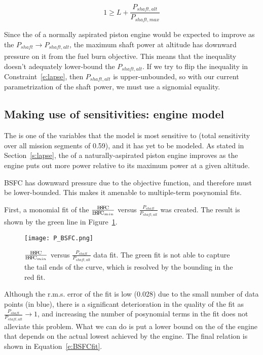 \begin{equation}
    \label{e:lapse}
    1 \geq L + \frac{P_{shaft,alt}}{P_{shaft,max}}
\end{equation}

Since the \BSFC of a normally aspirated piston engine would be expected to improve
as the $P_{shaft} \xrightarrow[]{} P_{shaft,alt}$, the maximum shaft
power at altitude has downward pressure on it from the fuel burn objective. This means that the
inequality doesn't adequately lower-bound the $P_{shaft,alt}$. If we try to flip the inequality in
Constraint~\ref{e:lapse}, then $P_{shaft,alt}$ is upper-unbounded, so with our current parametrization
of the shaft power, we must use a signomial equality.

\subsection{Making use of sensitivities: engine \BSFC model}
\label{s:BSFC}

The \BSFC is one of the variables that the model is most sensitive to (total sensitivity over all mission segments of 0.59),
and it has yet to be modeled. As
stated in Section~\ref{s:lapse}, the \BSFC of a naturally-aspirated piston engine improves as the engine
puts out more power relative to its maximum power at a given altitude.

BSFC has downward pressure due to the objective function, and therefore must be lower-bounded. This makes
it amenable to multiple-term posynomial fits.

First, a monomial fit of the $\frac{\BSFC}{\BSFC_{min}}$ versus $\frac{P_{shaft}}{P_{shaft,alt}}$ was created.
The result is shown by the green line in Figure~\ref{f:P_BSFC}.

\begin{figure}
    \centering
    \texttt{[image: P\_BSFC.png]}
    \caption[$\frac{\BSFC}{\BSFC_{min}}$ versus $\frac{P_{shaft}}{P_{shaft,alt}}$ data fit.]{$\frac{\BSFC}{\BSFC_{min}}$ versus $\frac{P_{shaft}}{P_{shaft,alt}}$ data fit. The green fit is
    not able to capture the tail ends of the curve, which is resolved by the bounding in the red fit.}
    \label{f:P_BSFC}
\end{figure}

Although the r.m.s. error of the fit is low (0.028) due to the small number of data points (in blue),
there is a significant deterioration in the quality of the
fit as $\frac{P_{shaft}}{P_{shaft,alt}} \xrightarrow[]{} 1$,
and increasing the number of posynomial terms in the fit does not alleviate this problem.
What we can do is put a lower bound on the \BSFC of the engine that depends on the actual
lowest \BSFC achieved by the engine. The final \BSFC relation is shown in Equation~\ref{e:BSFCfit}.

